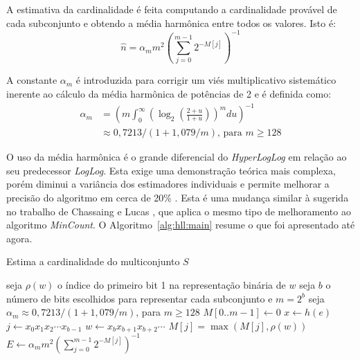 A estimativa da cardinalidade é feita computando a cardinalidade provável de cada subconjunto e obtendo a média harmônica entre todos os valores. Isto é:
\[
    \hat{n} = \alpha_m m^2 \left(\sum_{j=0}^{m-1} 2^{-M[j]}\right)^{-1}
\]

A constante $\alpha_m$ é introduzida para corrigir um viés multiplicativo sistemático inerente ao cálculo da média harmônica de potências de 2 e é definida como:
\begin{align*}
    \alpha_m & = \left( m \int_0^\infty \left( \log_2 \left( \frac{2+u}{1+u} \right) \right)^m du \right) ^ {-1} \\
             & \approx  0,7213/(1+ 1,079/m) \text{, para } m \geq 128
\end{align*}

O uso da média harmônica é o grande diferencial do \emph{HyperLogLog} em relação ao seu predecessor \emph{LogLog}. Esta exige uma demonstração teórica mais complexa, porém diminui a variância dos estimadores individuais e permite melhorar a precisão do algoritmo em cerca de 20\% \cite{flajolet2008hyperloglog}. Esta é uma mudança similar à sugerida no trabalho de Chassaing e Lucas \cite{chassaing2007efficient}, que aplica o mesmo tipo de melhoramento ao algoritmo \emph{MinCount}. O Algoritmo~\ref{alg:hll:main} resume o que foi apresentado até agora. 

\begin{algorithm}
\linespread{1}\selectfont
\caption{Estima a cardinalidade do multiconjunto $S$}
\label{alg:hll:main}
\begin{algorithmic}[1]
\State seja $\rho(w)$ o índice do primeiro bit 1 na representação binária de $w$
\State seja $b$ o número de bits escolhidos para representar cada subconjunto e $m=2^b$
\State seja $\alpha_m \approx 0,7213/(1 + 1,079/m)$, para $m \geq 128$
    \State $M[0..m-1] \gets 0$
        \State $x \gets h(e)$
        \State $j \gets x_0x_1x_2 \cdots x_{b-1}$
        \State $w \gets x_b x_{b+1}x_{b+2} \cdots$
        \State $M[j] = \max(M[j], \rho(w))$
    \EndFor
    \State $E \gets \alpha_m m^2 \left(\sum_{j=0}^{m-1} 2^{-M[j]}\right)^{-1}$
	  
	  
    \Else{ }
    \EndIf
\EndFunction
\end{algorithmic}
\end{algorithm}

